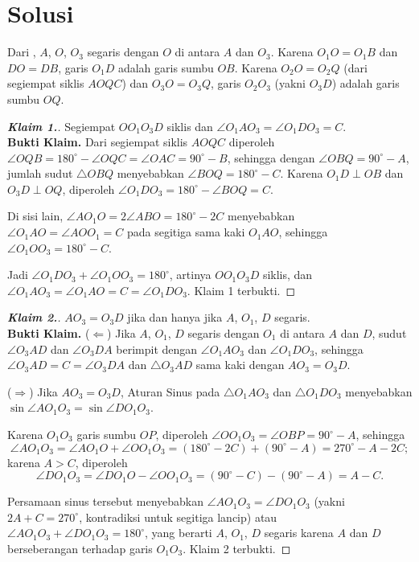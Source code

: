 \newpage
\section{Solusi}
Dari , $A$, $O$, $O_3$ segaris dengan $O$ di antara $A$ dan $O_3$. Karena $O_1O = O_1B$ dan $DO = DB$, garis $O_1D$ adalah garis sumbu $OB$. Karena $O_2O = O_2Q$ (dari segiempat siklis $AOQC$) dan $O_3O = O_3Q$, garis $O_2O_3$ (yakni $O_3D$) adalah garis sumbu $OQ$.



\begin{proof}[\textbf{Klaim 1.}] Segiempat $OO_1O_3D$ siklis dan $\angle O_1AO_3 = \angle O_1DO_3 = C$.\\
    \textbf{Bukti Klaim.} Dari segiempat siklis $AOQC$ diperoleh $\angle OQB = 180^\circ - \angle OQC = \angle OAC = 90^\circ - B$, sehingga dengan $\angle OBQ = 90^\circ - A$, jumlah sudut $\triangle OBQ$ menyebabkan $\angle BOQ = 180^\circ - C$. Karena $O_1D \perp OB$ dan $O_3D \perp OQ$, diperoleh $\angle O_1DO_3 = 180^\circ - \angle BOQ = C$.

    Di sisi lain, $\angle AO_1O = 2\angle ABO = 180^\circ - 2C$ menyebabkan $\angle O_1AO = \angle AOO_1 = C$ pada segitiga sama kaki $O_1AO$, sehingga $\angle O_1OO_3 = 180^\circ - C$.

    Jadi $\angle O_1DO_3 + \angle O_1OO_3 = 180^\circ$, artinya $OO_1O_3D$ siklis, dan $\angle O_1AO_3 = \angle O_1AO = C = \angle O_1DO_3$. Klaim 1 terbukti.
\end{proof}

\newpage
\begin{proof}[\textbf{Klaim 2.}] $AO_3 = O_3D$ jika dan hanya jika $A$, $O_1$, $D$ segaris.\\
    \textbf{Bukti Klaim.} ($\Leftarrow$) Jika $A$, $O_1$, $D$ segaris dengan $O_1$ di antara $A$ dan $D$, sudut $\angle O_3AD$ dan $\angle O_3DA$ berimpit dengan $\angle O_1AO_3$ dan $\angle O_1DO_3$, sehingga $\angle O_3AD = C = \angle O_3DA$ dan $\triangle O_3AD$ sama kaki dengan $AO_3 = O_3D$.

    ($\Rightarrow$) Jika $AO_3 = O_3D$, Aturan Sinus pada $\triangle O_1AO_3$ dan $\triangle O_1DO_3$ menyebabkan $\sin\angle AO_1O_3 = \sin\angle DO_1O_3$.

    Karena $O_1O_3$ garis sumbu $OP$, diperoleh $\angle OO_1O_3 = \angle OBP = 90^\circ - A$, sehingga
    \[
        \angle AO_1O_3 = \angle AO_1O + \angle OO_1O_3 = (180^\circ - 2C) + (90^\circ - A) = 270^\circ - A - 2C;
    \]
    karena $A > C$, diperoleh
    \[
        \angle DO_1O_3 = \angle DO_1O - \angle OO_1O_3 = (90^\circ - C) - (90^\circ - A) = A - C.
    \]

    Persamaan sinus tersebut menyebabkan $\angle AO_1O_3 = \angle DO_1O_3$ (yakni $2A + C = 270^\circ$, kontradiksi untuk segitiga lancip) atau $\angle AO_1O_3 + \angle DO_1O_3 = 180^\circ$, yang berarti $A$, $O_1$, $D$ segaris karena $A$ dan $D$ berseberangan terhadap garis $O_1O_3$. Klaim 2 terbukti.
\end{proof}
\hrulefill

